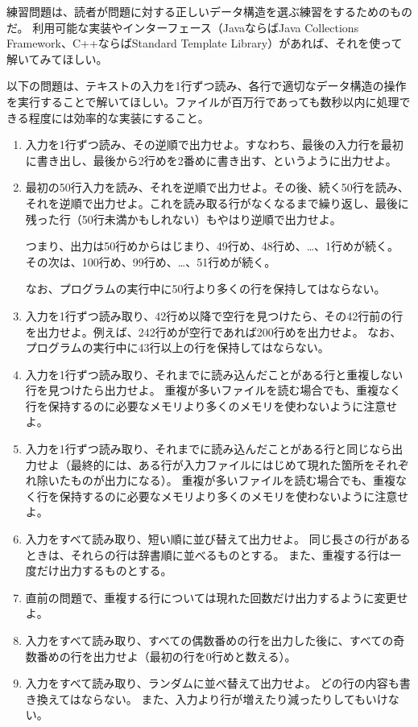 \begin{exc}
練習問題は、読者が問題に対する正しいデータ構造を選ぶ練習をするためのものだ。
利用可能な実装やインターフェース（JavaならばJava Collections Framework、C++ならばStandard Template Library）があれば、それを使って解いてみてほしい。

以下の問題は、テキストの入力を1行ずつ読み、各行で適切なデータ構造の操作を実行することで解いてほしい。ファイルが百万行であっても数秒以内に処理できる程度には効率的な実装にすること。

  \begin{enumerate}
    \item 入力を1行ずつ読み、その逆順で出力せよ。すなわち、最後の入力行を最初に書き出し、最後から2行めを2番めに書き出す、というように出力せよ。

    \item  最初の50行入力を読み、それを逆順で出力せよ。その後、続く50行を読み、それを逆順で出力せよ。これを読み取る行がなくなるまで繰り返し、最後に残った行（50行未満かもしれない）もやはり逆順で出力せよ。

      つまり、出力は50行めからはじまり、49行め、48行め、…、1行めが続く。
	  その次は、100行め、99行め、…、51行めが続く。

	 なお、プログラムの実行中に50行より多くの行を保持してはならない。

    \item 入力を1行ずつ読み取り、42行め以降で空行を見つけたら、その42行前の行を出力せよ。例えば、242行めが空行であれば200行めを出力せよ。
	なお、プログラムの実行中に43行以上の行を保持してはならない。

    \item 入力を1行ずつ読み取り、それまでに読み込んだことがある行と重複しない行を見つけたら出力せよ。
	重複が多いファイルを読む場合でも、重複なく行を保持するのに必要なメモリより多くのメモリを使わないように注意せよ。

    \item 入力を1行ずつ読み取り、それまでに読み込んだことがある行と同じなら出力せよ（最終的には、ある行が入力ファイルにはじめて現れた箇所をそれぞれ除いたものが出力になる）。
	重複が多いファイルを読む場合でも、重複なく行を保持するのに必要なメモリより多くのメモリを使わないように注意せよ。

    \item 入力をすべて読み取り、短い順に並び替えて出力せよ。
	同じ長さの行があるときは、それらの行は辞書順に並べるものとする。
	また、重複する行は一度だけ出力するものとする。

    \item 直前の問題で、重複する行については現れた回数だけ出力するように変更せよ。

    \item 入力をすべて読み取り、すべての偶数番めの行を出力した後に、すべての奇数番めの行を出力せよ（最初の行を0行めと数える）。

    \item 入力をすべて読み取り、ランダムに並べ替えて出力せよ。
	どの行の内容も書き換えてはならない。
	また、入力より行が増えたり減ったりしてもいけない。
  \end{enumerate}
\end{exc}

